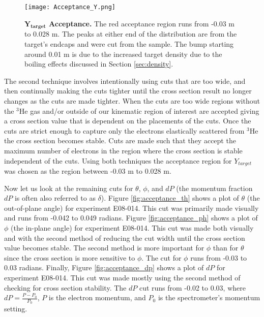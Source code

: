 \begin{figure}[!ht]
\begin{center}
\texttt{[image: Acceptance\_Y.png]}
\end{center}
\caption[$Y_{target}$ Acceptance]{
{\bf{$\boldsymbol{Y_{target}}$ Acceptance.}} The red acceptance region runs from -0.03 m to 0.028 m. The peaks at either end of the distribution are from the target's endcaps and were cut from the sample. The bump starting around 0.01 m is due to the increased target density due to the boiling effects discussed in Section \ref{sec:density}.}
\label{fig:acceptance_y}
\end{figure}

The second technique involves intentionally using cuts that are too wide, and then continually making the cuts tighter until the cross section result no longer changes as the cuts are made tighter. When the cuts are too wide regions without the $^3$He gas and/or outside of our kinematic region of interest are accepted giving a cross section value that is dependent on the placements of the cuts. Once the cuts are strict enough to capture only the electrons elastically scattered from $^3$He the cross section becomes stable. Cuts are made such that they accept the maximum number of electrons in the region where the cross section is stable independent of the cuts. Using both techniques the acceptance region for $Y_{target}$ was chosen as the region between -0.03 m to 0.028 m.

Now let us look at the remaining cuts for $\theta$, $\phi$, and $dP$ (the momentum fraction $dP$ is often also referred to as $\delta$). Figure \ref{fig:acceptance_th} shows a plot of $\theta$ (the out-of-plane angle) for experiment E08-014. This cut was primarily made visually and runs from -0.042 to 0.049 radians. Figure \ref{fig:acceptance_ph} shows a plot of $\phi$ (the in-plane angle) for experiment E08-014. This cut was made both visually and with the second method of reducing the cut width until the cross section value becomes stable. The second method is more important for $\phi$ than for $\theta$ since the cross section is more sensitive to $\phi$. The cut for $\phi$ runs from -0.03 to 0.03 radians. Finally, Figure \ref{fig:acceptance_dp} shows a plot of $dP$ for experiment E08-014. This cut was made mostly using the second method of checking for cross section stability. The $dP$ cut runs from -0.02 to 0.03, where $dP = \frac{P-P_0}{P_0}$, $P$ is the electron momentum, and $P_0$ is the spectrometer's momentum setting.

